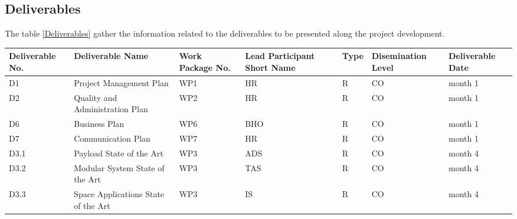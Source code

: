 \subsection{Deliverables}

The table \ref{Deliverables} gather the information related to the deliverables to be presented along the project development. 

\begin{longtable}[H]{p{1.8cm} p{2cm} p{1.3cm} p{1.8cm} p{1.3cm} p{2.1cm} p{1.8cm}}
	\toprule[2pt]
	
	\textbf{Deliverable No.} & \textbf{Deliverable Name} & \textbf{Work Package No.} & \textbf{Lead Participant Short Name} & \textbf{Type} & \textbf{Disemination Level} & \textbf{Deliverable Date} \\
	
	\midrule[1.5pt] 
	\endhead
	
	D1 & Project Management Plan & WP1 & HR & R & CO & month 1  \vspace{0.2cm} \\
	
	\midrule
	
	D2 & Quality and Administration Plan & WP2 & HR & R & CO & month 1  \vspace{0.2cm} \\
	
	\midrule

	D6 & Business Plan & WP6 & BHO & R & CO & month 1  \vspace{0.2cm} \\
	
	\midrule
	
	D7 & Communication Plan & WP7 & HR & R & CO & month 1  \vspace{0.2cm} \\

	\midrule

 	D3.1 & Payload State of the Art & WP3 & ADS & R & CO & month 4  \vspace{0.2cm} \\

 	\midrule

	D3.2 & Modular System State of the Art  & WP3 & TAS & R & CO & month 4  \vspace{0.2cm} \\
	
	\midrule
	
	D3.3 & Space Applications State of the Art & WP3 & IS & R  & CO  & month 4 \vspace{0.2cm} \\


\end{longtable}
